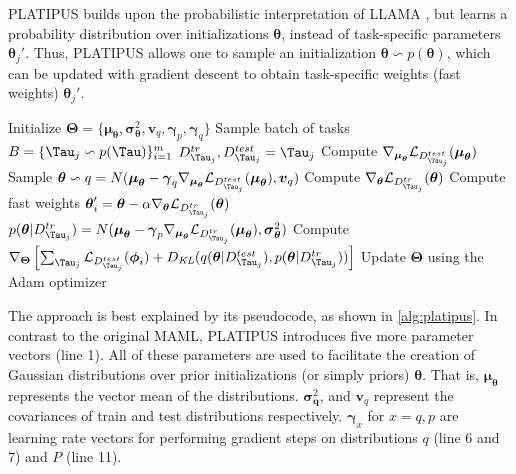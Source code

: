 PLATIPUS  builds upon the probabilistic interpretation of LLAMA , but learns a probability distribution over initializations $\boldsymbol{\theta}$, instead of task-specific parameters $\boldsymbol{\theta}_{j}'$. Thus, PLATIPUS allows one to sample an initialization $\boldsymbol{\theta} \backsim p(\boldsymbol{\theta})$, which can be updated with gradient descent to obtain task-specific weights (fast weights) $\boldsymbol{\theta}_{j}'$.  
\begin{algorithm}
\caption{PLATIPUS training algorithm by }\label{alg:platipus}
\begin{algorithmic}[1]
\State Initialize $\boldsymbol{\Theta} = \{ \boldsymbol{\mu}_{\boldsymbol{\theta}}, \boldsymbol{\sigma}^{2}_{\boldsymbol{\theta}}, \boldsymbol{v}_{q}, \boldsymbol{\gamma}_{p}, \boldsymbol{\gamma}_{q} \}$
    \State Sample batch of tasks $B = \{\Tau_{j} \backsim p(\Tau)\}_{i=1}^{m}$
        \State $D^{tr}_{\Tau_{j}}, D^{test}_{\Tau_{j}} = \Tau_{j}$
        \State Compute $\nabla_{\boldsymbol{\mu}_{\boldsymbol{\theta}}} \mathcal{L}_{D^{test}_{\Tau_{j}}}(\boldsymbol{\mu}_{\boldsymbol{\theta}})$
        \State Sample $\boldsymbol{\theta} \backsim q = N(\boldsymbol{\mu}_{\boldsymbol{\theta}} - \boldsymbol{\gamma}_{q} \nabla_{\boldsymbol{\mu}_{\boldsymbol{\theta}}} \mathcal{L}_{D^{test}_{\Tau_{j}}}(\boldsymbol{\mu}_{\boldsymbol{\theta}}), \boldsymbol{v}_{q})$
        \State Compute $\nabla_{\boldsymbol{\theta}} \mathcal{L}_{D^{tr}_{\Tau_{j}}}(\boldsymbol{\theta})$
        \State Compute fast weights $\boldsymbol{\theta}'_{i} = \boldsymbol{\theta} - \alpha \nabla_{\boldsymbol{\theta}} \mathcal{L}_{D^{tr}_{\Tau_{j}}}(\boldsymbol{\theta})$
    \EndFor
    \State $p(\boldsymbol{\theta} | D^{tr}_{\Tau_{j}}) = N(\boldsymbol{\mu}_{\boldsymbol{\theta}} - \boldsymbol{\gamma}_{p} \nabla_{\boldsymbol{\mu}_{\boldsymbol{\theta}}} \mathcal{L}_{D^{tr}_{\Tau_{j}}}(\boldsymbol{\mu}_{\boldsymbol{\theta}}), \boldsymbol{\sigma}^{2}_{\boldsymbol{\theta}}  ) $
    \State Compute $\nabla_{\boldsymbol{\Theta}}\left[ \sum_{\Tau_{j}} \mathcal{L}_{D^{test}_{\Tau_{j}}}(\boldsymbol{\phi}_{i}) + D_{\mathit{KL}}( q(\boldsymbol{\theta} | D^{test}_{\Tau_{j}}), p(\boldsymbol{\theta} | D^{tr}_{\Tau_{j}}) )   \right]$
    \State Update $\boldsymbol{\Theta}$ using the Adam optimizer
\EndWhile
\end{algorithmic}
\end{algorithm}
The approach is best explained by its pseudocode, as shown in \autoref{alg:platipus}. In contrast to the original MAML, PLATIPUS introduces five more parameter vectors (line 1). All of these parameters are used to facilitate the creation of Gaussian distributions over prior initializations (or simply priors) $\boldsymbol{\theta}$. That is, $\boldsymbol{\mu}_{\boldsymbol{\theta}}$ represents the vector mean of the distributions. $\boldsymbol{\sigma}^{2}_{\boldsymbol{q}}$, and $\boldsymbol{v}_{q}$ represent the covariances of train and test distributions respectively. $\boldsymbol{\gamma}_{x}$ for $x = q,p$ are learning rate vectors for performing gradient steps on distributions $q$ (line 6 and 7) and $P$ (line 11). 
